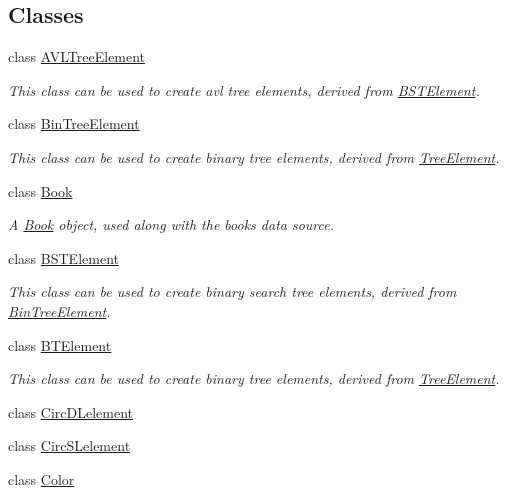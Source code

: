 \subsection*{Classes}
\begin{DoxyCompactItemize}
\item 
class \hyperlink{classbridges_1_1_a_v_l_tree_element}{A\+V\+L\+Tree\+Element}
\begin{DoxyCompactList}\small\item\em This class can be used to create avl tree elements, derived from \hyperlink{classbridges_1_1_b_s_t_element}{B\+S\+T\+Element}. \end{DoxyCompactList}\item 
class \hyperlink{classbridges_1_1_bin_tree_element}{Bin\+Tree\+Element}
\begin{DoxyCompactList}\small\item\em This class can be used to create binary tree elements, derived from \hyperlink{classbridges_1_1_tree_element}{Tree\+Element}. \end{DoxyCompactList}\item 
class \hyperlink{classbridges_1_1_book}{Book}
\begin{DoxyCompactList}\small\item\em A \hyperlink{classbridges_1_1_book}{Book} object, used along with the books data source. \end{DoxyCompactList}\item 
class \hyperlink{classbridges_1_1_b_s_t_element}{B\+S\+T\+Element}
\begin{DoxyCompactList}\small\item\em This class can be used to create binary search tree elements, derived from \hyperlink{classbridges_1_1_bin_tree_element}{Bin\+Tree\+Element}. \end{DoxyCompactList}\item 
class \hyperlink{classbridges_1_1_b_t_element}{B\+T\+Element}
\begin{DoxyCompactList}\small\item\em This class can be used to create binary tree elements, derived from \hyperlink{classbridges_1_1_tree_element}{Tree\+Element}. \end{DoxyCompactList}\item 
class \hyperlink{classbridges_1_1_circ_d_lelement}{Circ\+D\+Lelement}
\item 
class \hyperlink{classbridges_1_1_circ_s_lelement}{Circ\+S\+Lelement}
\item 
class \hyperlink{classbridges_1_1_color}{Color}

\end{DoxyCompactItemize}
